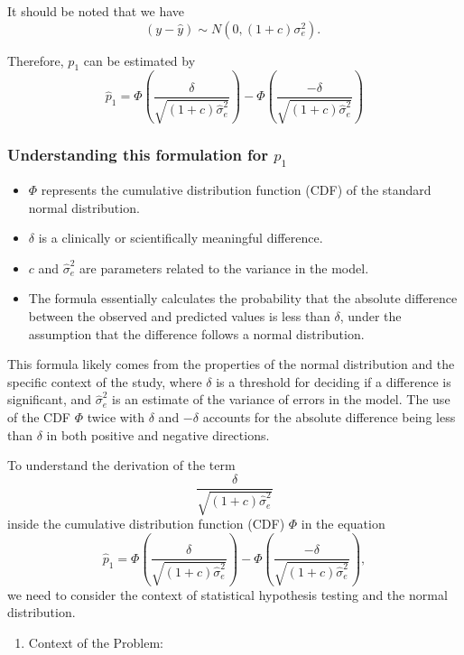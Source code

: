 \documentclass[
  12pt,
  a4paper,
]{article}
\providecommand{\tightlist}{%
  \setlength{\itemsep}{0pt}\setlength{\parskip}{0pt}}
\numberwithin{equation}{section}
\theoremstyle{plain}
\theoremstyle{definition}
\theoremstyle{remark}
\theoremstyle{note}
\begin{document}
It should be noted that we have \[
(y-\hat{y}) \sim N\left(0,(1+c) \sigma_e^2\right) \text {. }
\]

Therefore, \(p_1\) can be estimated by \[
\hat{p}_1=\Phi\left(\frac{\delta}{\sqrt{(1+c) \hat{\sigma}_e^2}}\right)-\Phi\left(\frac{-\delta}{\sqrt{(1+c) \hat{\sigma}_e^2}}\right)
\]

\hypertarget{understanding-this-formulation-for-p_1}{%
\subsubsection{\texorpdfstring{Understanding this formulation for
\(p_1\)}{Understanding this formulation for p\_1}}\label{understanding-this-formulation-for-p_1}}

\begin{itemize}
\tightlist
\item
  \(\Phi\) represents the cumulative distribution function (CDF) of the
  standard normal distribution.
\item
  \(\delta\) is a clinically or scientifically meaningful difference.
\item
  \(c\) and \(\hat{\sigma}_e^2\) are parameters related to the variance
  in the model.
\item
  The formula essentially calculates the probability that the absolute
  difference between the observed and predicted values is less than
  \(\delta\), under the assumption that the difference follows a normal
  distribution.
\end{itemize}

This formula likely comes from the properties of the normal distribution
and the specific context of the study, where \(\delta\) is a threshold
for deciding if a difference is significant, and \(\hat{\sigma}_e^2\) is
an estimate of the variance of errors in the model. The use of the CDF
\(\Phi\) twice with \(\delta\) and \(-\delta\) accounts for the absolute
difference being less than \(\delta\) in both positive and negative
directions.

To understand the derivation of the term \[
\frac{\delta}{\sqrt{(1+c) \hat{\sigma}_e^2}}
\] inside the cumulative distribution function (CDF) \(\Phi\) in the
equation \[
\hat{p}_1=\Phi\left(\frac{\delta}{\sqrt{(1+c) \hat{\sigma}_e^2}}\right)-\Phi\left(\frac{-\delta}{\sqrt{(1+c) \hat{\sigma}_e^2}}\right),
\] we need to consider the context of statistical hypothesis testing and
the normal distribution.

\begin{enumerate}
\def\labelenumi{\arabic{enumi}.}
\tightlist
\item
  Context of the Problem:
\end{enumerate}
\end{document}
